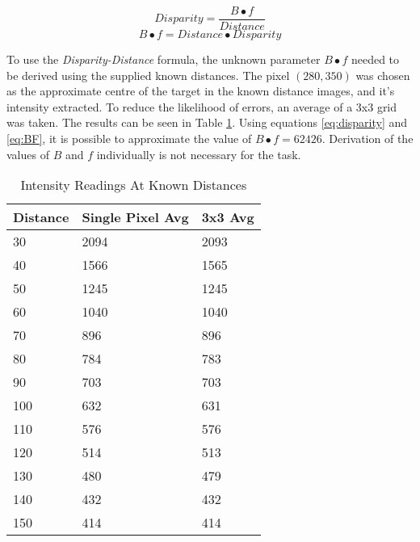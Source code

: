 \documentclass[conference]{IEEEtran}
\begin{document}
\begin{equation} \label{eq:disparity}
Disparity = \frac{B \bullet f}{Distance}
\end{equation}
\begin{equation} \label{eq:BF}
B \bullet f = Distance \bullet Disparity
\end{equation}

To use the \textit{Disparity-Distance} formula, the unknown parameter $B \bullet f$ needed to be derived using the supplied known distances. The pixel $(280,350)$ was chosen as the approximate centre of the target in the known distance images, and it's intensity extracted. To reduce the likelihood of errors, an average of a 3x3 grid was taken. The results can be seen in Table \ref{tab:intensity_results}. Using equations \ref{eq:disparity} and \ref{eq:BF}, it is possible to approximate the value of $B \bullet f = 62426$. Derivation of the values of $B$ and $f$ individually is not necessary for the task.



\begin{table}[]
\caption{Intensity Readings At Known Distances}
\label{tab:intensity_results}
\begin{tabular}{|l|l|l|}
\hline
\textbf{Distance} & \textbf{Single Pixel Avg} & \textbf{3x3 Avg} \\ \hline
30                 & 2094 & 2093         \\ \hline
40                & 1566 & 1565         \\ \hline
50                 & 1245 & 1245         \\ \hline
60                 & 1040 & 1040         \\ \hline
70                 & 896 & 896         \\ \hline
80                & 784 & 783         \\ \hline
90                & 703 & 703         \\ \hline
100                 & 632 & 631          \\ \hline
110      & 576 & 576           \\ \hline
120      & 514 & 513         \\ \hline
130                 & 480 &479          \\ \hline
140				& 432	& 432	\\ \hline
150				&	414 & 414	\\ \hline
\end{tabular}
\end{table} 
\end{document}
